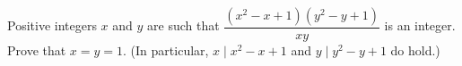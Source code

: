 Positive integers $x$ and $y$ are such that $\dfrac{\left(x^2-x+1\right)\left(y^2-y+1\right)}{xy}$ is an integer. Prove that $x=y=1$. (In particular, $x\mid x^2-x+1$ and $y\mid y^2-y+1$ do hold.)
